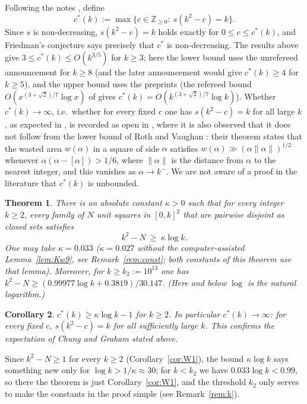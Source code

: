 \documentclass[11pt]{amsart}
\newtheorem{theorem}{Theorem}[section]
\newtheorem{corollary}[theorem]{Corollary}
\theoremstyle{definition}
\theoremstyle{remark}
\newcommand{\Z}{\mathbb{Z}}
\begin{document}
Following the notes \cite[file \texttt{s12/search/FRIEDMAN.md}]{Dan}, define
\[
c^*(k):=\max\{c\in\Z_{\ge0}:\ s(k^2-c)=k\}.
\]
Since $s$ is non-decreasing, $s(k^2-c)=k$ holds exactly for $0\le c\le c^*(k)$, and Friedman's conjecture says
precisely that $c^*$ is non-decreasing. The results above give $3\le c^*(k)\le O(k^{3/5})$ for $k\ge3$; here the lower
bound uses the unrefereed announcement \cite{Dan} for $k\ge 8$ (and the later announcement would give $c^*(k)\ge4$ for $k\ge5$), and the upper bound uses the preprints \cite{McC,Bui}
(the refereed bound $O(x^{(3+\sqrt2)/7}\log x)$ of \cite{CG09} gives $c^*(k)=O(k^{(3+\sqrt2)/7}\log k)$).
Whether $c^*(k)\to\infty$, i.e.\ whether for every fixed $c$ one has $s(k^2-c)=k$ for
all large $k$, as expected in \cite{CG09}, is recorded as open in \cite{Dan}, where it is also observed that it does not follow from the lower bound
of Roth and Vaughan \cite{RV}: their theorem \cite[p.~170, Theorem]{RV} states that the wasted area $w(\alpha)$ in a square of side $\alpha$
satisfies $w(\alpha)\gg(\alpha\|\alpha\|)^{1/2}$ whenever $\alpha(\alpha-[\alpha])>1/6$, where $\|\alpha\|$ is the
distance from $\alpha$ to the nearest integer, and this vanishes as $\alpha\to k^-$. We are not aware of a proof in the
literature that $c^*(k)$ is unbounded.

\begin{theorem}\label{thm:main}
There is an absolute constant $\kappa>0$ such that for every integer $k\ge 2$, every family of $N$ unit
squares in $[0,k]^2$ that are pairwise disjoint as closed sets satisfies
\[
k^2-N\ \ge\ \kappa\log k .
\]
One may take $\kappa=0.033$ ($\kappa=0.027$ without the computer-assisted Lemma~\ref{lem:Kw9}, see Remark~\ref{rem:const};
both constants of this theorem use that lemma). Moreover, for $k\ge k_2:=10^{13}$ one has
$k^2-N\ge(0.99977\log k+0.3819)/30.147$. (Here and below $\log$ is the natural logarithm.)
\end{theorem}

\begin{corollary}\label{cor:main}
$c^*(k)\ge \kappa\log k-1$ for $k\ge 2$. In particular $c^*(k)\to\infty$: for every fixed $c$,
$s(k^2-c)=k$ for all sufficiently large $k$. This confirms the expectation of Chung and Graham \cite{CG09} stated above.
\end{corollary}

Since $k^2-N\ge1$ for every $k\ge2$ (Corollary~\ref{cor:W1}), the bound $\kappa\log k$ says something new only for
$\log k>1/\kappa\approx30$; for $k<k_2$ we have $0.033\log k<0.99$, so there the theorem is just Corollary~\ref{cor:W1},
and the threshold $k_2$ only serves to make the constants in the proof simple (see Remark~\ref{rem:k}).
\end{document}
